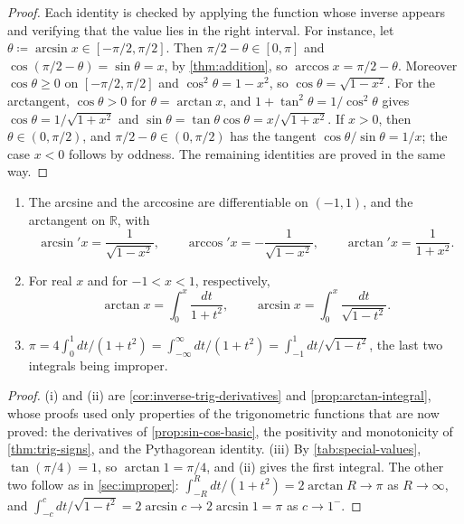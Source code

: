 \begin{proof}
Each identity is checked by applying the function whose inverse appears and verifying that the value lies in the right interval. For instance, let $\theta\coloneqq\arcsin x\in[-\pi/2,\pi/2]$. Then $\pi/2-\theta\in[0,\pi]$ and $\cos(\pi/2-\theta)=\sin\theta=x$, by \cref{thm:addition}, so $\arccos x=\pi/2-\theta$. Moreover $\cos\theta\ge0$ on $[-\pi/2,\pi/2]$ and $\cos^2\theta=1-x^2$, so $\cos\theta=\sqrt{1-x^2}$. For the arctangent, $\cos\theta>0$ for $\theta=\arctan x$, and $1+\tan^2\theta=1/\cos^2\theta$ gives $\cos\theta=1/\sqrt{1+x^2}$ and $\sin\theta=\tan\theta\cos\theta=x/\sqrt{1+x^2}$. If $x>0$, then $\theta\in(0,\pi/2)$, and $\pi/2-\theta\in(0,\pi/2)$ has the tangent $\cos\theta/\sin\theta=1/x$; the case $x<0$ follows by oddness. The remaining identities are proved in the same way.
\end{proof}

\begin{theorem}
\label{thm:inverse-trig-calculus}
\leavevmode
\begin{enumerate}
\item The arcsine and the arccosine are differentiable on $(-1,1)$, and the arctangent on $\mathbb R$, with
\[
\arcsin'x=\frac1{\sqrt{1-x^2}},\qquad\arccos'x=-\frac1{\sqrt{1-x^2}},\qquad\arctan'x=\frac1{1+x^2} .
\]
\item For real $x$ and for $-1<x<1$, respectively,
\[
\arctan x=\int_0^x\frac{dt}{1+t^2},\qquad\arcsin x=\int_0^x\frac{dt}{\sqrt{1-t^2}} .
\]
\item $\pi=4\int_0^1dt/(1+t^2)=\int_{-\infty}^\infty dt/(1+t^2)=\int_{-1}^1dt/\sqrt{1-t^2}$, the last two integrals being improper.
\end{enumerate}
\end{theorem}

\begin{proof}
(i) and (ii) are \cref{cor:inverse-trig-derivatives} and \cref{prop:arctan-integral}, whose proofs used only properties of the trigonometric functions that are now proved: the derivatives of \cref{prop:sin-cos-basic}, the positivity and monotonicity of \cref{thm:trig-signs}, and the Pythagorean identity. (iii) By \cref{tab:special-values}, $\tan(\pi/4)=1$, so $\arctan1=\pi/4$, and (ii) gives the first integral. The other two follow as in \cref{sec:improper}: $\int_{-R}^Rdt/(1+t^2)=2\arctan R\to\pi$ as $R\to\infty$, and $\int_{-c}^cdt/\sqrt{1-t^2}=2\arcsin c\to2\arcsin1=\pi$ as $c\to1^-$.
\end{proof}

